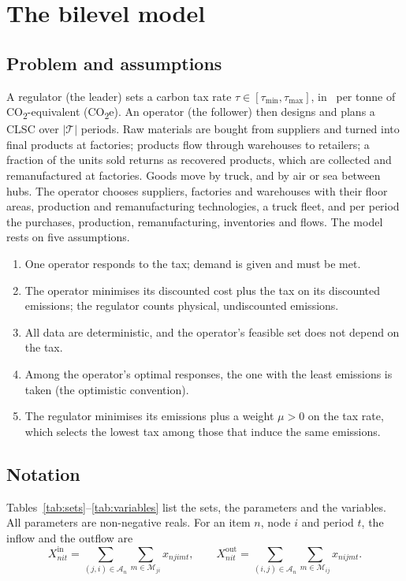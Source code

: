 \documentclass[review,11pt,nonatbib]{elsarticle}
\theoremstyle{remark}
\newcommand{\tmin}{\tau_{\min}}
\newcommand{\tmax}{\tau_{\max}}
\newcommand{\Xin}{X^{\mathrm{in}}}
\newcommand{\Xout}{X^{\mathrm{out}}}
\newcommand{\EUR}{\texteuro}
\newcommand{\CO}{CO\textsubscript{2}e}
\begin{document}
\section{The bilevel model}\label{sec:model}

\subsection{Problem and assumptions}\label{sec:assumptions}

A regulator (the leader) sets a carbon tax rate $\tau \in [\tmin, \tmax]$, in \EUR\ per tonne of CO\textsubscript{2}-equivalent (\CO). An operator (the follower) then designs and plans a CLSC over $|\mathcal{T}|$ periods. Raw materials are bought from suppliers and turned into final products at factories; products flow through warehouses to retailers; a fraction of the units sold returns as recovered products, which are collected and remanufactured at factories. Goods move by truck, and by air or sea between hubs. The operator chooses suppliers, factories and warehouses with their floor areas, production and remanufacturing technologies, a truck fleet, and per period the purchases, production, remanufacturing, inventories and flows. The model rests on five assumptions.
\begin{enumerate}
\item[(A1)] One operator responds to the tax; demand is given and must be met.
\item[(A2)] The operator minimises its discounted cost plus the tax on its discounted emissions; the regulator counts physical, undiscounted emissions.
\item[(A3)] All data are deterministic, and the operator's feasible set does not depend on the tax.
\item[(A4)] Among the operator's optimal responses, the one with the least emissions is taken (the optimistic convention).
\item[(A5)] The regulator minimises its emissions plus a weight $\mu > 0$ on the tax rate, which selects the lowest tax among those that induce the same emissions.
\end{enumerate}

\subsection{Notation}\label{sec:notation}

Tables~\ref{tab:sets}--\ref{tab:variables} list the sets, the parameters and the variables. All parameters are non-negative reals. For an item $n$, node $i$ and period $t$, the inflow and the outflow are
\begin{equation}\label{eq:flows}
\Xin_{nit} = \sum_{(j,i) \in \mathcal{A}_n} \sum_{m \in \mathcal{M}_{ji}} x_{njimt}, \qquad \Xout_{nit} = \sum_{(i,j) \in \mathcal{A}_n} \sum_{m \in \mathcal{M}_{ij}} x_{nijmt}.
\end{equation}
\end{document}
